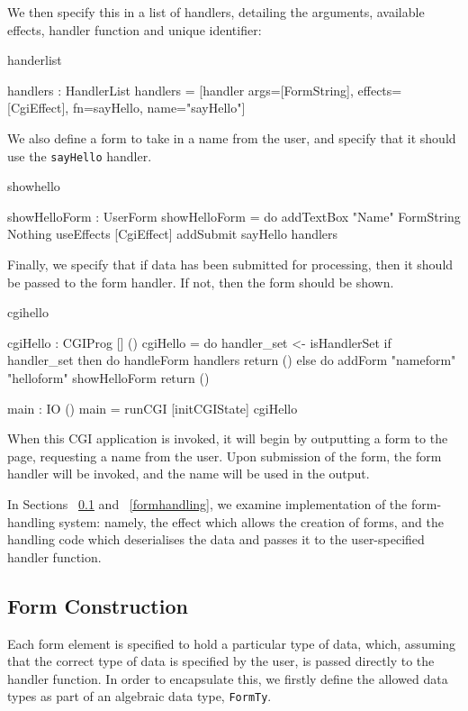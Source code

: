 We then specify this in a list of handlers, detailing the arguments, available effects, handler function and unique identifier:

\begin{SaveVerbatim}{handerlist}

handlers : HandlerList
handlers = [handler args=[FormString], 
                    effects=[CgiEffect], 
                    fn=sayHello, 
                    name="sayHello"]

\end{SaveVerbatim}

We also define a form to take in a name from the user, and specify that it should use the \texttt{sayHello} handler.

\begin{SaveVerbatim}{showhello}

showHelloForm : UserForm
showHelloForm = do
  addTextBox "Name" FormString Nothing
  useEffects [CgiEffect]
  addSubmit sayHello handlers

\end{SaveVerbatim}

\noindent
Finally, we specify that if data has been submitted for processing, then it
should be passed to the form handler. If not, then the form should be shown.

\begin{SaveVerbatim}{cgihello}

cgiHello : CGIProg [] ()
cgiHello = do
  handler_set <- isHandlerSet
  if handler_set then do
    handleForm handlers
    return ()
  else do
    addForm "nameform" "helloform" showHelloForm
    return ()

main : IO ()
main = runCGI [initCGIState] cgiHello

\end{SaveVerbatim}

\noindent
When this CGI application is invoked, it will begin by outputting a form to the
page, requesting a name from the user. Upon submission of the form, the form
handler will be invoked, and the name will be used in the output.

In Sections ~\ref{formcons} and ~\ref{formhandling}, we examine implementation
of the form-handling system: namely, the effect which allows the creation of
forms, and the handling code which deserialises the data and passes it to the
user-specified handler function.  

\subsection{Form Construction}
\label{formcons}
Each form element is specified  to hold a particular type of data, which, assuming that the correct type of data is specified by the user, is passed directly to the handler function. In order to encapsulate this, we firstly define the allowed data types as part of an algebraic data type, \texttt{FormTy}.

